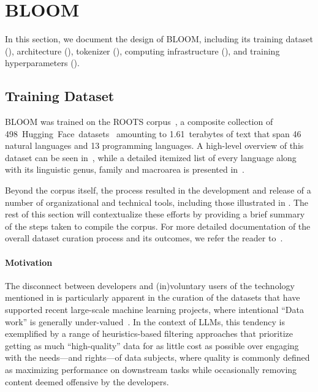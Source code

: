 \documentclass[twoside,11pt]{article}
\begin{document}
\section{BLOOM}

In this section, we document the design of BLOOM, including its training dataset (), architecture (), tokenizer (), computing infrastructure (), and training hyperparameters ().

\subsection{Training Dataset}
\label{sec:dataset}

BLOOM was trained on the ROOTS corpus~\citep{laurencon2022bigscience}, a composite collection of 498~Hugging~Face~datasets~\citep{lhoest-etal-2021-datasets} amounting to 1.61~terabytes of text that span 46 natural languages and 13 programming languages. A high-level overview of this dataset can be seen in~, while a detailed itemized list of every language along with its linguistic genus, family and macroarea is presented in~.

Beyond the corpus itself, the process resulted in the development and release of a number of organizational and technical tools, including those illustrated in .
The rest of this section will contextualize these efforts by providing a brief summary of the steps taken to compile the corpus. For more detailed documentation of the overall dataset curation process and its outcomes, we refer the reader to~\citet{laurencon2022bigscience}.

\paragraph{Motivation} The disconnect between developers and (in)voluntary users of the technology mentioned in  is particularly apparent in the curation of the datasets that have supported recent large-scale machine learning projects, where intentional ``Data work'' is generally under-valued~\citep{sambasivan2021cascades}. In the context of LLMs, this tendency is exemplified by a range of heuristics-based filtering approaches that prioritize getting as much ``high-quality'' data for as little cost as possible over engaging with the needs---and rights---of data subjects, where quality is commonly defined as maximizing performance on downstream tasks while occasionally removing content deemed offensive by the developers.
\end{document}
